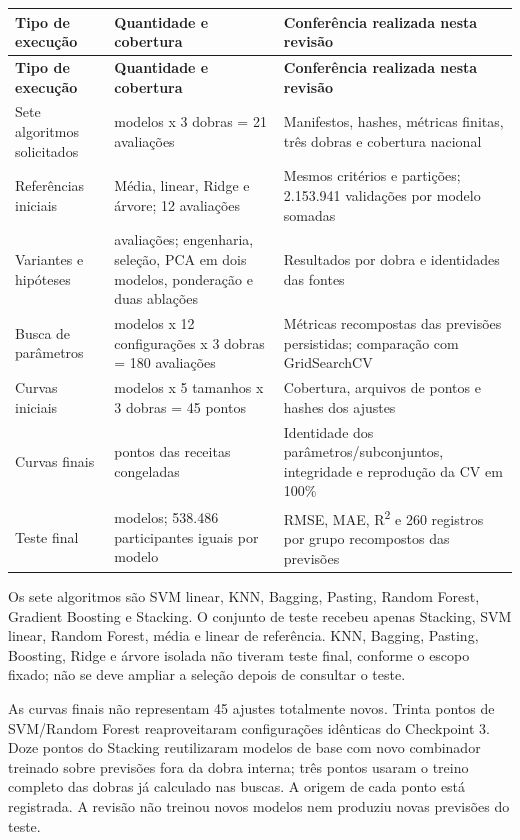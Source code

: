\documentclass[12pt,a4paper]{article}
\begin{document}
\begingroup\singlespacing\setlength{\tabcolsep}{3pt}
\renewcommand{\arraystretch}{1.08}
\begin{longtable}{@{}>{\raggedright\arraybackslash}p{}>{\raggedright\arraybackslash}p{}>{\raggedright\arraybackslash}p{}@{}}
\toprule
\textbf{Tipo de execução} & \textbf{Quantidade e cobertura} & \textbf{Conferência realizada nesta revisão} \\
\midrule
\endfirsthead
\toprule
\textbf{Tipo de execução} & \textbf{Quantidade e cobertura} & \textbf{Conferência realizada nesta revisão} \\
\midrule\endhead
Sete algoritmos solicitados & 7 modelos x 3 dobras = 21 avaliações & Manifestos, hashes, métricas finitas, três dobras e cobertura nacional \\
Referências iniciais & Média, linear, Ridge e árvore; 12 avaliações & Mesmos critérios e partições; 2.153.941 validações por modelo somadas \\
Variantes e hipóteses & 21 avaliações; engenharia, seleção, PCA em dois modelos, ponderação e duas ablações & Resultados por dobra e identidades das fontes \\
Busca de parâmetros & 5 modelos x 12 configurações x 3 dobras = 180 avaliações & Métricas recompostas das previsões persistidas; comparação com GridSearchCV \\
Curvas iniciais & 3 modelos x 5 tamanhos x 3 dobras = 45 pontos & Cobertura, arquivos de pontos e hashes dos ajustes \\
Curvas finais & 45 pontos das receitas congeladas & Identidade dos parâmetros/subconjuntos, integridade e reprodução da CV em 100\% \\
Teste final & 5 modelos; 538.486 participantes iguais por modelo & RMSE, MAE, R\textsuperscript{2} e 260 registros por grupo recompostos das previsões \\
\bottomrule
\end{longtable}
\endgroup\par\vspace{4pt}
Os sete algoritmos são SVM linear, KNN, Bagging, Pasting, Random Forest, Gradient Boosting e Stacking. O conjunto de teste recebeu apenas Stacking, SVM linear, Random Forest, média e linear de referência. KNN, Bagging, Pasting, Boosting, Ridge e árvore isolada não tiveram teste final, conforme o escopo fixado; não se deve ampliar a seleção depois de consultar o teste.


As curvas finais não representam 45 ajustes totalmente novos. Trinta pontos de SVM/Random Forest reaproveitaram configurações idênticas do Checkpoint 3. Doze pontos do Stacking reutilizaram modelos de base com novo combinador treinado sobre previsões fora da dobra interna; três pontos usaram o treino completo das dobras já calculado nas buscas. A origem de cada ponto está registrada. A revisão não treinou novos modelos nem produziu novas previsões do teste.
\end{document}
